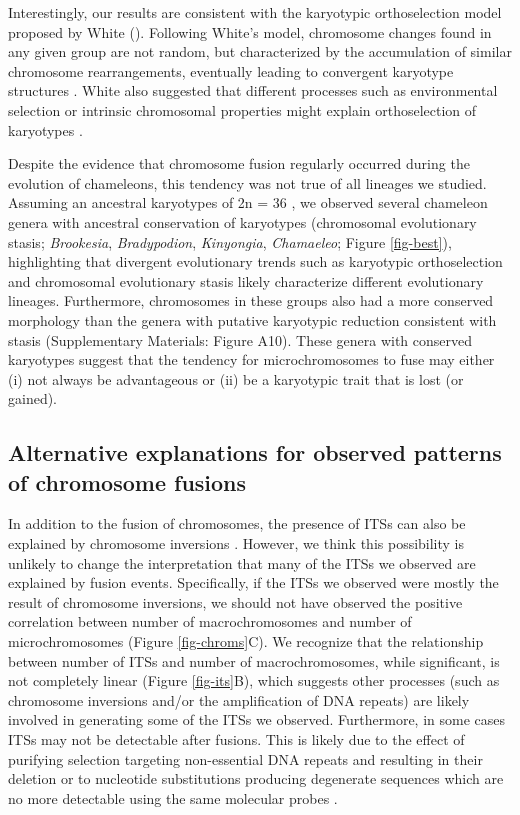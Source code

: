 \documentclass[a4paper, 12pt]{article}
\begin{document}
Interestingly, our results are consistent with the karyotypic orthoselection model proposed by White (\citeyear{white1973,white1975chromosome}). 
Following White's model, chromosome changes found in any given group are not random, but characterized by the accumulation of similar chromosome rearrangements, eventually leading to convergent karyotype structures \citep{white1973,white1975chromosome}. 
White also suggested that different processes such as environmental selection or intrinsic chromosomal properties might explain orthoselection of karyotypes \citep{white1973,white1975chromosome}.

Despite the evidence that chromosome fusion regularly occurred during the evolution of chameleons, this tendency was not true of all lineages we studied. Assuming an ancestral karyotypes of 2n = 36 \citep[][see Materials and Methods]{rovatsos2017evolution}, we observed several chameleon genera with ancestral conservation of karyotypes (chromosomal evolutionary stasis; \textit{Brookesia}, \textit{Bradypodion}, \textit{Kinyongia}, \textit{Chamaeleo}; Figure \ref{fig-best}), highlighting that divergent evolutionary trends such as karyotypic orthoselection and chromosomal evolutionary stasis likely characterize different evolutionary lineages. 
Furthermore, chromosomes in these groups also had a more conserved morphology than the genera with putative karyotypic reduction consistent with stasis (Supplementary Materials: Figure A10). 
These genera with conserved karyotypes suggest that the tendency for microchromosomes to fuse may either (i) not always be advantageous or (ii) be a karyotypic trait that is lost (or gained). 

\subsection{Alternative explanations for observed patterns of chromosome fusions}
In addition to the fusion of chromosomes, the presence of ITSs can also be explained by chromosome inversions \citep{bolzan2017interstitial}. 
However, we think this possibility is unlikely to change the interpretation that many of the ITSs we observed are explained by fusion events. 
Specifically, if the ITSs we observed were mostly the result of chromosome inversions, we should not have observed the positive correlation between number of macrochromosomes and number of microchromosomes (Figure \ref{fig-chroms}C). 
We recognize that the relationship between number of ITSs and number of macrochromosomes, while significant, is not completely linear (Figure \ref{fig-its}B), which suggests other processes (such as chromosome inversions and/or the amplification of DNA repeats) are likely involved in generating some of the ITSs we observed.
Furthermore, in some cases ITSs may not be detectable after fusions. 
This is likely due to the effect of purifying selection targeting non-essential DNA repeats and resulting in their deletion or to nucleotide substitutions producing degenerate sequences which are no more detectable using the same molecular probes \citep[see e.g.][]{lin2008endings,aksenova2019beginning}.
\end{document}
